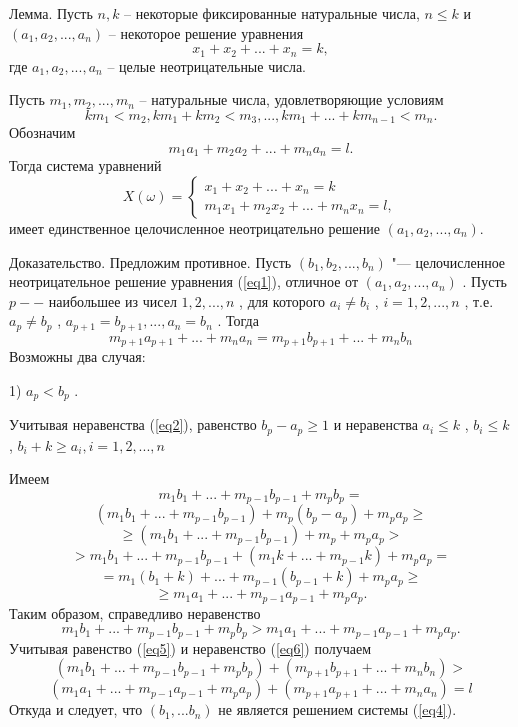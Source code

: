 {{{{{ Лемма. Пусть }{ $n,k$}{  -- некоторые фиксированные
натуральные числа, }$n\leq k${  и }$(a_{1},a_{2},...,a_{n})${
-- некоторое решение уравнения}
\begin{equation}
\label{eq1}
x_{1}+x_{2}+...+x_{n}=k,
\end{equation}
{ где }$a_{1},a_{2},...,a_{n}${  -- целые неотрицательные числа.}

{ Пусть }$m_{1},m_{2},...,m_{n}${   -- натуральные числа,
удовлетворяющие условиям}
\begin{equation}
\label{eq2}
km_{1}<m_{2}, km_{1}+km_{2}<m_{3},...,km_{1}+...+km_{n-1}<m_{n}.
\end{equation}
{ Обозначим}
\begin{equation}
\label{eq3}
m_{1}a_{1}+m_{2}a_{2}+...+m_{n}a_{n}=l.
\end{equation}
{ Тогда система уравнений}
\begin{equation}
\label{eq4}
X(\omega) =
 \begin{cases}
   x_{1}+x_{2}+...+x_{n}=k\\
   m_{1}x_{1}+m_{2}x_{2}+...+m_{n}x_{n}=l ,
 \end{cases}
\end{equation}
имеет единственное целочисленное неотрицательно решение $(a_{1},a_{2},...,a_{n})$.

{ Доказательство. Предложим противное. Пусть $(b_{1},b_{2},...,b_{n})$   "--- целочисленное неотрицательное решение уравнения (\ref{eq1}),
отличное от }$(a_{1},a_{2},...,a_{n})${ . Пусть $p --$ наибольшее из чисел
}$1,2,...,n${ , для которого }$a_{i}\neq b_{i}${ ,
}$i=1,2,...,n${ , т.е. }$a_{p}\neq b_{p}${ , }$a_{p+1}=b_{p+1},...,a_{n}=b_{n}${ . Тогда}
\begin{equation}
\label{eq5}
m_{p+1}a_{p+1}+...+m_{n}a_{n}=m_{p+1}b_{p+1}+...+m_{n}b_{n}
\end{equation}
{ Возможны два случая:}

{ 1) }$a_{p}<b_{p}${ .}

{ Учитывая неравенства (\ref{eq2}), равенство }$b_{p}-a_{p}\geq 1${  и
неравенства }$a_{i}\leq k${ , }$b_{i}\leq k${ ,
}$b_{i}+k\geq a_{i}, i=1,2,...,n$

{ Имеем}
\[
m_{1}b_{1}+...+m_{p-1}b_{p-1}+m_{p}b_{p}=
\]
\[
(m_{1}b_{1}+...+m_{p-1}b_{p-1})+
m_{p}(b_{p}-a_{p})+m_{p}a_{p} \geq
\]
\[
\geq(m_{1}b_{1}+...+m_{p-1}b_{p-1})+m_{p}+m_{p}a_{p}>
\]
\[
>m_{1}b_{1}+...+m_{p-1}b_{p-1}+(m_{1}k+...+m_{p-1}k)+m_{p}a_{p}=
\]
\[
=m_{1}(b_{1}+k)+...+m_{p-1}(b_{p-1}+k)+m_{p}a_{p}\geq
\]
\[
\geq m_{1}a_{1}+...+m_{p-1}a_{p-1}+m_{p}a_{p}.
\]
{ Таким образом, справедливо неравенство}
\begin{equation}
\label{eq6}
m_{1}b_{1}+...+m_{p-1}b_{p-1}+m_{p}b_{p}>m_{1}a_{1}+...+m_{p-1}a_{p-1}+m_{p}a_{p}.
\end{equation}
{ Учитывая равенство (\ref{eq5}) и неравенство (\ref{eq6}) получаем}
\[
(m_{1}b_{1}+...+m_{p-1}b_{p-1}+m_{p}b_{p})+(m_{p+1}b_{p+1}+...+m_{n}b_{n})>
\]
\[
(m_{1}a_{1}+...+m_{p-1}a_{p-1}+m_{p}a_{p})+(m_{p+1}a_{p+1}+...+m_{n}a_{n})=l
\]
{ Откуда и следует, что } $ (b_{1},...b_{n})${   не является
решением системы (\ref{eq4}).}

}}}}
